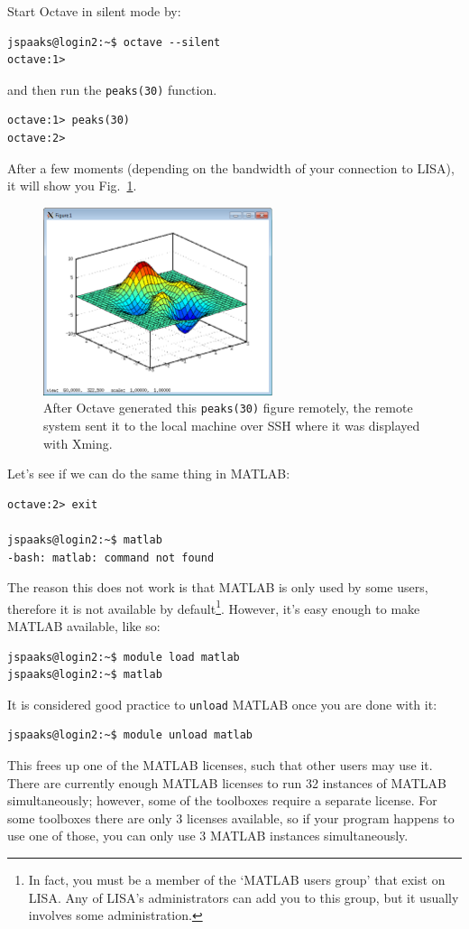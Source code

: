 Start Octave in silent mode by:
\begin{lstlisting}[style=basic,style=bash]
jspaaks@login2:~$ octave --silent
octave:1>
\end{lstlisting}
and then run the \lstinline[style=bashinline]{peaks(30)} function.
\begin{lstlisting}[style=basic,style=bash]
octave:1> peaks(30)
octave:2>
\end{lstlisting}
After a few moments (depending on the bandwidth of your connection to LISA), it will show you Fig.~\ref{fig:octave-peaks-x-forwarding}.
\begin{figure}[!htb]
  \centering
    \includegraphics[width=0.6\textwidth]{./../eps/octave-peaks-x-forwarding.eps}
  \caption{After Octave generated this \lstinline[style=bashinline]{peaks(30)} figure remotely, the remote system sent it to the local machine over SSH where it was displayed with Xming.}
  \label{fig:octave-peaks-x-forwarding}
\end{figure}


\needspace{4em}
Let's see if we can do the same thing in MATLAB:
\begin{lstlisting}[style=basic,style=bash]
octave:2> exit

jspaaks@login2:~$ matlab
-bash: matlab: command not found
\end{lstlisting}
The reason this does not work is that MATLAB is only used by some users, therefore it is not available by default\footnote{In fact, you must be a member of the `MATLAB users group' that exist on LISA. Any of LISA's administrators can add you to this group, but it usually involves some administration.}. However, it's easy enough to make MATLAB available, like so:
\begin{lstlisting}[style=basic,style=bash]
jspaaks@login2:~$ module load matlab
jspaaks@login2:~$ matlab
\end{lstlisting}
It is considered good practice to \lstinline[style=bashinline]{unload} MATLAB once you are done with it:
\begin{lstlisting}[style=basic,style=bash]
jspaaks@login2:~$ module unload matlab
\end{lstlisting}
This frees up one of the MATLAB licenses, such that other users may use it. There are currently enough MATLAB licenses to run 32 instances of MATLAB simultaneously; however, some of the toolboxes require a separate license. For some toolboxes there are only 3 licenses available, so if your program happens to use one of those, you can only use 3 MATLAB instances simultaneously.

